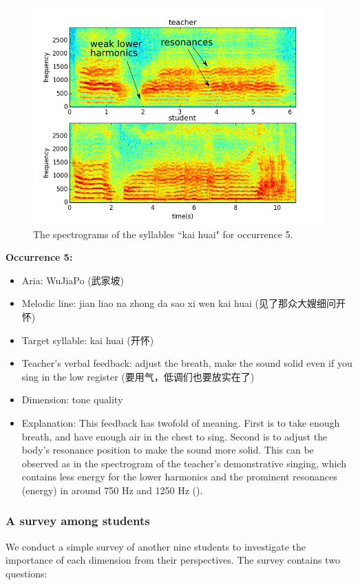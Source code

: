 \begin{figure}[ht!]
\includegraphics[width=\textwidth]{figs/spectro_vis/ch3_occ5.png}
\caption{The spectrograms of the syllables ``kai huai" for occurrence 5.}
\label{fig:occurrence_5}
\end{figure}

\noindent\textbf{Occurrence 5:}

\begin{itemize}[leftmargin=*, noitemsep]
\item Aria: WuJiaPo (武家坡)
\item Melodic line: jian liao na zhong da sao xi wen kai huai (见了那众大嫂细问开怀)
\item Target syllable: kai huai (开怀)
\item Teacher's verbal feedback: adjust the breath, make the sound solid even if you sing in the low register (要用气，低调们也要放实在了)
\item Dimension: tone quality
\item Explanation: This feedback has twofold of meaning. First is to take enough breath, and have enough air in the chest to sing. Second is to adjust the body's resonance position to make the sound more solid. This can be observed as in the spectrogram of the teacher's demonstrative singing, which contains less energy for the lower harmonics and the prominent resonances (energy) in around 750 Hz and 1250 Hz ().
\end{itemize}

\subsubsection{A survey among students}
We conduct a simple survey of another nine students to investigate the importance of each dimension from their perspectives. The survey contains two questions: 

